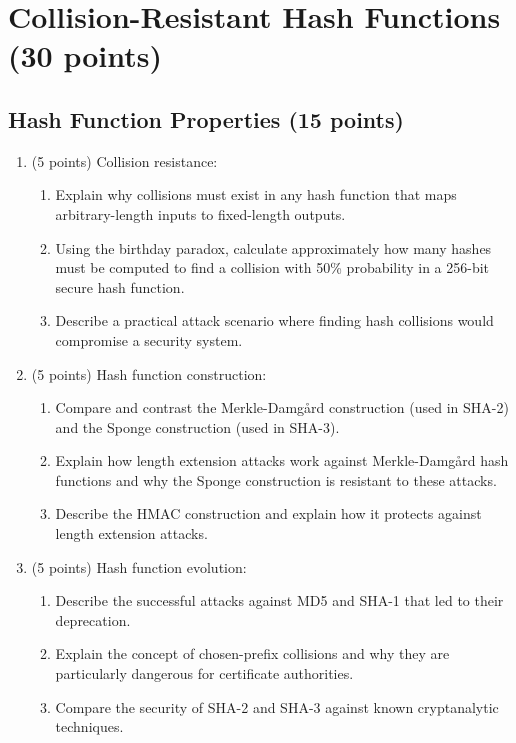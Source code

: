 \documentclass[10pt,a4paper,american]{article}
\begin{document}
\section{Collision-Resistant Hash Functions (30 points)}

\subsection{Hash Function Properties (15 points)}

\begin{enumerate}
	\item (5 points) Collision resistance:
	      \begin{enumerate}
		      \item Explain why collisions must exist in any hash function that maps arbitrary-length inputs to fixed-length outputs.
		      \item Using the birthday paradox, calculate approximately how many hashes must be computed to find a collision with 50\% probability in a 256-bit secure hash function.
		      \item Describe a practical attack scenario where finding hash collisions would compromise a security system.
	      \end{enumerate}

	\item (5 points) Hash function construction:
	      \begin{enumerate}
		      \item Compare and contrast the Merkle-Damgård construction (used in SHA-2) and the Sponge construction (used in SHA-3).
		      \item Explain how length extension attacks work against Merkle-Damgård hash functions and why the Sponge construction is resistant to these attacks.
		      \item Describe the HMAC construction and explain how it protects against length extension attacks.
	      \end{enumerate}

	\item (5 points) Hash function evolution:
	      \begin{enumerate}
		      \item Describe the successful attacks against MD5 and SHA-1 that led to their deprecation.
		      \item Explain the concept of chosen-prefix collisions and why they are particularly dangerous for certificate authorities.
		      \item Compare the security of SHA-2 and SHA-3 against known cryptanalytic techniques.
	      \end{enumerate}
\end{enumerate}
\end{document}
